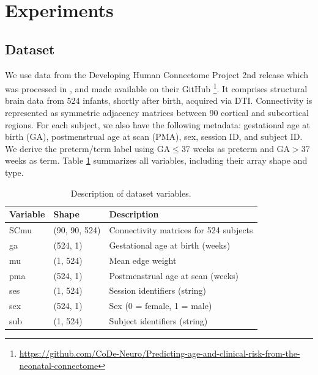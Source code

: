 \documentclass[doubleblind]{ecai}
\begin{document}


\section{Experiments}

\subsection{Dataset}
We use data from the Developing Human Connectome Project 2nd release \cite{hughes2017dedicated} which was processed in \cite{taoudi2022predicting}, and made available on their GitHub \footnote{\url{https://github.com/CoDe-Neuro/Predicting-age-and-clinical-risk-from-the-neonatal-connectome}}. It comprises structural brain data from 524 infants, shortly after birth, acquired via DTI. Connectivity is represented as symmetric adjacency matrices between 90 cortical and subcortical regions. For each subject, we also have the following metadata: gestational age at birth (GA), postmenstrual age at scan (PMA), sex, session ID, and subject ID. We derive the preterm/term label using GA$\leq$37 weeks as preterm and GA$>$37 weeks as term.
Table \ref{tab:raw_dataset} summarizes all variables, including their array shape and type.


\begin{table}[h]
    \centering
    \caption{Description of dataset variables.}
    \footnotesize
    \begin{tabular}{lll}
        \toprule
        \textbf{Variable} & \textbf{Shape} & \textbf{Description} \\
        \midrule
        SCmu & (90, 90, 524) & Connectivity matrices for 524 subjects \\
        ga   & (524, 1)     & Gestational age at birth (weeks) \\
        mu   & (1, 524)     & Mean edge weight\\
        pma  & (524, 1)     & Postmenstrual age at scan (weeks) \\
        ses  & (1, 524)     & Session identifiers (string) \\
        sex  & (524, 1)     & Sex (0 = female, 1 = male) \\
        sub  & (1, 524)     & Subject identifiers (string) \\
        \bottomrule
    \end{tabular}
    \label{tab:raw_dataset}
\end{table}
\end{document}
